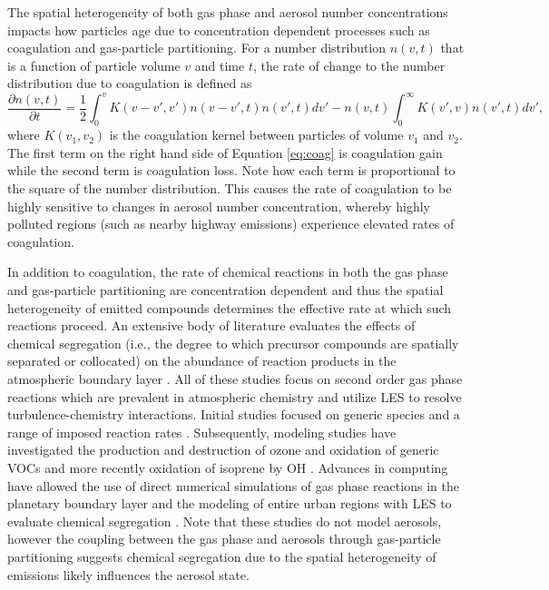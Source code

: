 The spatial heterogeneity of both gas phase and aerosol number concentrations impacts how particles age due to concentration dependent processes such as coagulation and gas-particle partitioning. For a number distribution $n(v,t)$ that is a function of particle volume $v$ and time $t$, the rate of change to the number distribution due to coagulation is defined as 
\begin{equation}
\frac{\partial n(v, t)}{\partial t} = \frac{1}{2}\int_0^{v}K(v-v', v')n(v-v', t)n(v', t)dv' - n(v,t)\int_0^{\infty}K(v',v)n(v',t)dv',
\label{eq:coag}
\end{equation}
where $K(v_1, v_2)$ is the coagulation kernel between particles of volume $v_1$ and $v_2$. The first term on the right hand side of Equation \ref{eq:coag} is coagulation gain while the second term is coagulation loss. Note how each term is proportional to the square of the number distribution. This causes the rate of coagulation to be highly sensitive to changes in aerosol number concentration, whereby highly polluted regions (such as nearby highway emissions) experience elevated rates of coagulation. 

In addition to coagulation, the rate of chemical reactions in both the gas phase and gas-particle partitioning are concentration dependent and thus the spatial heterogeneity of emitted compounds  determines the effective rate at which such reactions proceed. An extensive body of literature evaluates the effects of chemical segregation (i.e., the degree to which precursor compounds are spatially separated or collocated) on the abundance of reaction products in the atmospheric boundary layer \parencite{schumann_large-eddy_1989, sykes_turbulent_1994, molemaker_control_1998, krol_effects_2000, vinuesa_fluxes_2003, auger_chemical_2007, pugh_influence_2011, ouwersloot_segregation_2011, dlugi_balances_2014, kim_impact_2016, li_error_2021, wang_segregation_2022}. All of these studies focus on second order gas phase reactions which are prevalent in atmospheric chemistry and utilize LES to resolve turbulence-chemistry interactions. Initial studies focused on generic species and a range of imposed reaction rates \parencite{schumann_large-eddy_1989, sykes_turbulent_1994, molemaker_control_1998}. Subsequently, modeling studies have investigated the production and destruction of ozone and oxidation of generic VOCs \parencite{krol_effects_2000, auger_chemical_2007} and more recently oxidation of isoprene by OH \parencite{pugh_influence_2011, ouwersloot_segregation_2011, dlugi_balances_2014, kim_impact_2016}. Advances in computing have allowed the use of direct numerical simulations of gas phase reactions in the planetary boundary layer \parencite{li_error_2021} and the modeling of entire urban regions with LES to evaluate chemical segregation \parencite{wang_segregation_2022}. Note that these studies do not model aerosols, however the coupling between the gas phase and aerosols through gas-particle partitioning suggests chemical segregation due to the spatial heterogeneity of emissions likely influences the aerosol state. %

